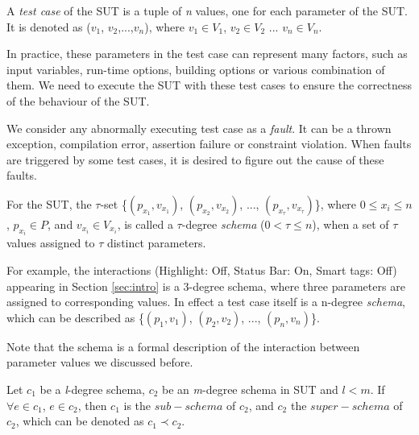 \begin{definition}\label{de:testcase}
A \emph{test case} of the SUT is a tuple of \emph{n} values, one for each parameter of the SUT. It is denoted as  ($v_{1}$, $v_{2}$,...,$v_{n}$), where $v_{1}\in V_{1}$, $v_{2} \in V_{2}$ ... $v_{n} \in V_{n}$.
\end{definition}

In practice, these parameters in the test case can represent many factors, such as input variables, run-time options, building options or various combination of them. We need to execute the SUT with these test cases to ensure the correctness of the behaviour of the SUT.

We consider any abnormally executing test case as a \emph{fault}. It can be a thrown exception, compilation error, assertion failure or constraint violation. When faults are triggered by some test cases, it is desired to figure out the cause of these faults.


\begin{definition}\label{de:schema}
For the SUT, the $\tau$-set \{$(p_{x_{1}}, v_{x_{1}})$, $(p_{x_{2}}, v_{x_{2}})$, ..., $(p_{x_{\tau}}, v_{x_{\tau}})$\}, where $0 \leq x_{i} \leq n$, $p_{x_{i}} \in P$, and $v_{x_{i}} \in V_{x_{i}}$, is called a $\tau$-degree \emph{schema} ($0 < \tau \leq n $), when a set of $\tau$ values assigned to $\tau$ distinct parameters.

For example, the interactions (Highlight: Off, Status Bar: On, Smart tags: Off) appearing in Section \ref{sec:intro} is a 3-degree schema, where three parameters are assigned to corresponding values. In effect a test case itself is a n-degree \emph{schema}, which can be described as \{$(p_{1}, v_{1})$, $(p_{2}, v_{2})$, ..., $(p_{n}, v_{n})$\}.
\end{definition}
Note that the schema is a formal description of the interaction between parameter values we discussed before.

\begin{definition}\label{de:subsume}
Let $c_{1}$ be a \emph{l}-degree schema, $c_{2}$ be an \emph{m}-degree schema in SUT and $l < m$. If $\forall e \in c_{1}$, $e \in c_{2}$, then $c_{1}$ is the $sub-schema$ of $c_{2}$, and $c_{2}$ the $super-schema$ of $c_{2}$, which can be denoted as $c_{1} \prec c_{2}$.
\end{definition}

